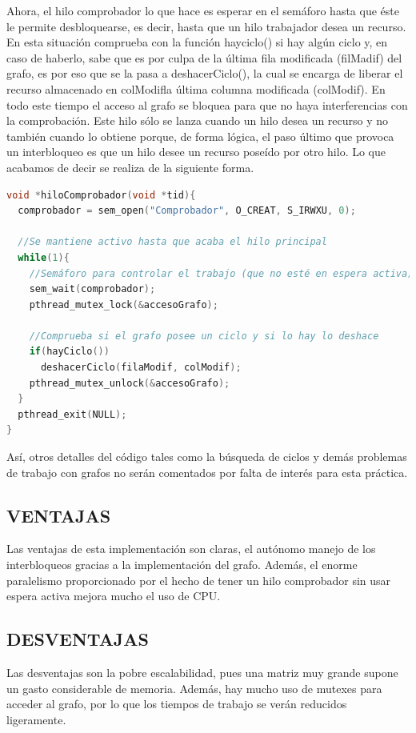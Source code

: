 \documentclass[10 pt,spanish]{article}  %
\begin{document}
Ahora, el hilo comprobador lo que hace es esperar en el semáforo hasta que éste le permite desbloquearse, es decir, hasta que un hilo trabajador desea un recurso. En esta situación comprueba con la función hayciclo() si hay algún ciclo y, en caso de haberlo, sabe que es por culpa de la última fila modificada (filMadif) del grafo, es por eso que se la pasa a deshacerCiclo(), la cual se encarga de liberar el recurso almacenado en colModifla última columna modificada (colModif). En todo este tiempo el acceso al grafo se bloquea para que no haya interferencias con la comprobación. Este hilo sólo se lanza cuando un hilo desea un recurso y no también cuando lo obtiene porque, de forma lógica, el paso último que provoca un interbloqueo es que un hilo desee un recurso poseído por otro hilo. Lo que acabamos de decir se realiza de la siguiente forma.

\begin{lstlisting}[language=C++,caption=Hilo comprobante]
     void *hiloComprobador(void *tid){
  comprobador = sem_open("Comprobador", O_CREAT, S_IRWXU, 0);

  //Se mantiene activo hasta que acaba el hilo principal
  while(1){
    //Semáforo para controlar el trabajo (que no esté en espera activa)
    sem_wait(comprobador);
    pthread_mutex_lock(&accesoGrafo);

    //Comprueba si el grafo posee un ciclo y si lo hay lo deshace
    if(hayCiclo())
      deshacerCiclo(filaModif, colModif);
    pthread_mutex_unlock(&accesoGrafo);
  }
  pthread_exit(NULL);
}
\end{lstlisting}
Así, otros detalles del código tales como la búsqueda de ciclos y demás problemas de trabajo con grafos no serán comentados por falta de interés para esta práctica.

\subsection{VENTAJAS}
Las ventajas de esta implementación son claras, el autónomo manejo de los interbloqueos gracias a la implementación del grafo. Además, el enorme paralelismo proporcionado por el hecho de tener un hilo comprobador sin usar espera activa mejora mucho el uso de CPU.

\subsection{DESVENTAJAS}
Las desventajas son la pobre escalabilidad, pues una matriz muy grande supone un gasto considerable de memoria. Además, hay mucho uso de mutexes para acceder al grafo, por lo que los tiempos de trabajo se verán reducidos ligeramente.
\end{document}
